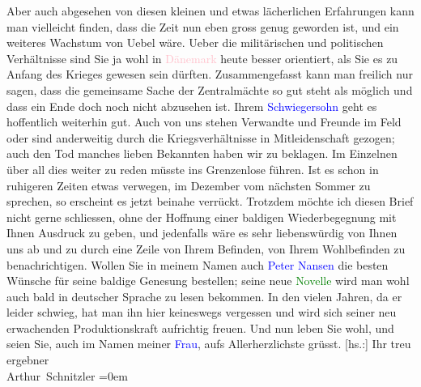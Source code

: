            \pstart
           Aber auch abgesehen von diesen kleinen und etwas lächerlichen Erfahrungen kann man
               vielleicht finden, dass die Zeit nun eben gross genug geworden ist, und ein weiteres
               Wachstum von Uebel wäre. Ueber die militärischen und politischen Verhältnisse sind
               Sie ja wohl in \textcolor{pink}{Dänemark}{}\ledrightnote{\textcolor{pink}{Dänemark}} heute besser orientiert,
               als Sie es zu Anfang des Krieges gewesen \introOben{}sein\introOben{} dürften.
               Zusammengefasst kann man freilich nur sagen, dass die gemeinsame Sache der
               Zentralmächte so gut steht als möglich und dass ein Ende doch noch nicht abzusehen
               ist. Ihrem \textcolor{blue}{Schwiegersohn}{} geht es
               hoffentlich weiterhin gut. Auch von uns stehen Verwandte und Freunde im Feld oder
               sind anderweitig durch die Kriegsverhältnisse in Mitleidenschaft gezogen; auch den
               Tod manches lieben {\pb}Bekannten haben wir zu
               beklagen. Im Einzelnen über all dies weiter zu reden müsste ins Grenzenlose führen.
               Ist es schon in ruhigeren Zeiten etwas verwegen, im Dezember vom nächsten Sommer zu
               sprechen, so erscheint es jetzt beinahe verrückt. Trotzdem möchte ich diesen Brief
               nicht gerne schliessen, ohne der Hoffnung einer baldigen Wiederbegegnung mit Ihnen
               Ausdruck zu geben, und jedenfalls wäre es sehr liebenswürdig von Ihnen uns ab und zu
               durch eine Zeile von Ihrem Befinden, von Ihrem Wohlbefinden zu benachrichtigen.
               Wollen Sie in meinem Namen auch \textcolor{blue}{Peter Nansen}{}\ledrightnote{\textcolor{blue}{Peter Nansen}} die
               besten Wünsche für seine baldige Genesung bestellen; seine neue \textcolor{green}{Novelle}{} wird man wohl auch bald in deutscher
               Sprache zu lesen bekommen. In den vielen Jahren, da er leider schwieg, hat man ihn
               hier keineswegs vergessen\strikeout{,} und wird sich seiner neu
               erwachenden Produktionskraft aufrichtig freuen.\pend
           \pstart
           Und nun leben Sie wohl, und seien Sie, auch im Namen meiner \textcolor{blue}{Frau}{}, aufs Allerherzlichste grüsst.\pend
           \pstart
           {[}hs.:{]} Ihr treu ergebner{\\[\baselineskip]}\spacefill\mbox{Arthur Schnitzler}\pend
           \leftskip=0em{}\endnumbering{}  
      